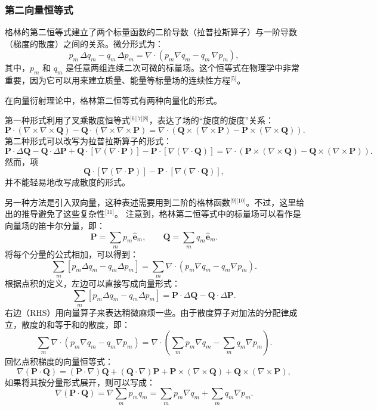\subsubsection{第二向量恒等式}
格林的第二恒等式建立了两个标量函数的二阶导数（拉普拉斯算子）与一阶导数（梯度的散度）之间的关系。微分形式为：
$$
p_{m}\,\Delta q_{m} - q_{m}\,\Delta p_{m} = \nabla \cdot \left(p_{m}\nabla q_{m} - q_{m}\,\nabla p_{m}\right),~
$$
其中，$p_{m}$ 和 $q_{m}$ 是任意两组连续二次可微的标量场。这个恒等式在物理学中非常重要，因为它可以用来建立质量、能量等标量场的连续性方程\(^\text{[5]}\)。

在向量衍射理论中，格林第二恒等式有两种向量化的形式。

第一种形式利用了叉乘散度恒等式\(^\text{[6][7][8]}\)，表达了场的“旋度的旋度”关系：
$$
\mathbf{P} \cdot (\nabla \times \nabla \times \mathbf{Q})
- \mathbf{Q} \cdot (\nabla \times \nabla \times \mathbf{P})
= \nabla \cdot \left(\mathbf{Q} \times (\nabla \times \mathbf{P})
- \mathbf{P} \times (\nabla \times \mathbf{Q})\right).~
$$
第二种形式可以改写为拉普拉斯算子的形式：
$$
\mathbf{P} \cdot \Delta \mathbf{Q} 
- \mathbf{Q} \cdot \Delta \mathbf{P} 
+ \mathbf{Q} \cdot [\nabla (\nabla \cdot \mathbf{P})]
- \mathbf{P} \cdot [\nabla (\nabla \cdot \mathbf{Q})]
= 
\nabla \cdot \left(\mathbf{P} \times (\nabla \times \mathbf{Q})
- \mathbf{Q} \times (\nabla \times \mathbf{P})\right).~
$$
然而，项
$$
\mathbf{Q} \cdot \left[\nabla \left(\nabla \cdot \mathbf{P} \right)\right]
-\mathbf{P} \cdot \left[\nabla \left(\nabla \cdot \mathbf{Q} \right)\right],~
$$
并不能轻易地改写成散度的形式。

另一种方法是引入双向量，这种表述需要用到二阶的格林函数\(^\text{[9][10]}\)。不过，这里给出的推导避免了这些复杂性\(^\text{[11]}\)。
注意到，格林第二恒等式中的标量场可以看作是向量场的笛卡尔分量，即：
$$
\mathbf{P} = \sum_{m} p_m \hat{\mathbf{e}}_m,
\qquad
\mathbf{Q} = \sum_{m} q_m \hat{\mathbf{e}}_m.~
$$
将每个分量的公式相加，可以得到：
$$
\sum_{m} \left[ p_m \Delta q_m - q_m \Delta p_m \right]
=
\sum_{m} \nabla \cdot \left( p_m \nabla q_m - q_m \nabla p_m \right).~
$$
根据点积的定义，左边可以直接写成向量形式：
$$
\sum_{m} \left[ p_m \Delta q_m - q_m \Delta p_m \right]
=
\mathbf{P} \cdot \Delta \mathbf{Q}
-
\mathbf{Q} \cdot \Delta \mathbf{P}.~
$$
右边（RHS）用向量算子来表达稍微麻烦一些。由于散度算子对加法的分配律成立，散度的和等于和的散度，即：
$$
\sum_{m} \nabla \cdot \left(p_{m} \nabla q_{m} - q_{m} \nabla p_{m} \right)
=
\nabla \cdot
\left(
\sum_{m} p_{m} \nabla q_{m}
-
\sum_{m} q_{m} \nabla p_{m}
\right).~
$$
回忆点积梯度的向量恒等式：
$$
\nabla(\mathbf{P} \cdot \mathbf{Q})
=
(\mathbf{P} \cdot \nabla)\mathbf{Q}
+
(\mathbf{Q} \cdot \nabla)\mathbf{P}
+
\mathbf{P} \times (\nabla \times \mathbf{Q})
+
\mathbf{Q} \times (\nabla \times \mathbf{P}),~
$$
如果将其按分量形式展开，则可以写成：
$$
\nabla(\mathbf{P} \cdot \mathbf{Q})
=
\nabla \sum_{m} p_{m} q_{m}
=
\sum_{m} p_{m} \nabla q_{m}
+
\sum_{m} q_{m} \nabla p_{m}.~
$$
